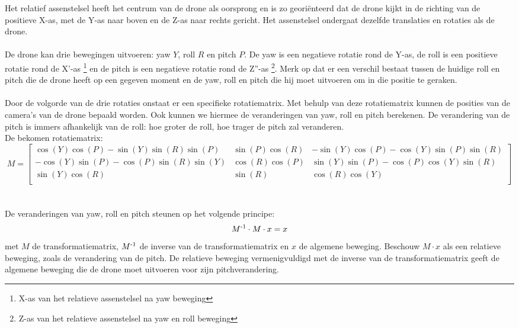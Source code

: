 \noindent
Het relatief assenstelsel heeft het centrum van de drone als oorsprong en is zo georiënteerd dat de drone kijkt in de richting van de positieve X-as, met de Y-as naar boven en de Z-as naar rechts gericht. Het assenstelsel ondergaat dezelfde translaties en rotaties als de drone.
\\
\\
De drone kan drie bewegingen uitvoeren: yaw \(Y\), roll \(R\) en pitch \(P\). De yaw is een negatieve rotatie rond de Y-as, de roll is een positieve rotatie rond de X'-as \footnote{X-as van  het relatieve assenstelsel na yaw beweging} en de pitch is een negatieve rotatie rond de Z''-as \footnote{Z-as van het relatieve assenstelsel na yaw en roll beweging}. Merk op dat er een verschil bestaat tussen de huidige roll en pitch die de drone heeft op een gegeven moment en de yaw, roll en pitch die hij moet uitvoeren om in die positie te geraken.  
\\
\\
Door de volgorde van de drie rotaties onstaat er een specifieke rotatiematrix. Met behulp van deze rotatiematrix kunnen de posities van de camera's van de drone bepaald worden. Ook kunnen we hiermee de veranderingen van yaw, roll en pitch berekenen. De verandering van de pitch is immers afhankelijk van de roll: hoe groter de roll, hoe trager de pitch zal veranderen.
\\
De bekomen rotatiematrix: 
\begin{equation*}
M = 
\begin{bmatrix}
\cos(Y)\cos(P) -\sin(Y)\sin(R)\sin(P) & \sin(P)\cos(R) & -\sin(Y)\cos(P) - \cos(Y)\sin(P)\sin(R)\\
-\cos(Y)\sin(P) - \cos(P)\sin(R)\sin(Y) & \cos(R)\cos(P) & \sin(Y)\sin(P) - \cos(P)\cos(Y)\sin(R) \\ 
\sin(Y)\cos(R) & \sin(R) & \cos(R)\cos(Y)\\
\end{bmatrix} \label{rotatiematrix}
\end{equation*}
\\
\\
De veranderingen van yaw, roll en pitch steunen op het volgende principe:
\begin{equation*}
M\textsuperscript{-1} \cdot M \cdot x = x \label{rotatieBewegingVergelijking}
\end{equation*}
met \(M\) de transformatiematrix, \(M\textsuperscript{-1}\) de inverse van de transformatiematrix en \(x\) de algemene beweging. Beschouw \(M \cdot x\) als een relatieve beweging, zoals de verandering van de pitch. De relatieve beweging vermenigvuldigd met de inverse van de transformatiematrix geeft de algemene beweging die de drone moet uitvoeren voor zijn pitchverandering.